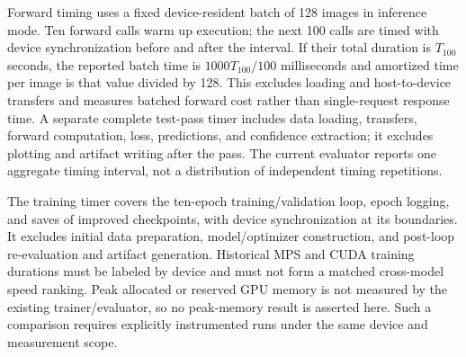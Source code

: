 Forward timing uses a fixed device-resident batch of 128 images in inference
mode. Ten forward calls warm up execution; the next 100 calls are timed with
device synchronization before and after the interval. If their total duration
is $T_{100}$ seconds, the reported batch time is $1000T_{100}/100$
milliseconds and amortized time per image is that value divided by 128.
This excludes loading and host-to-device transfers and measures batched
forward cost rather than single-request response time. A separate complete
test-pass timer includes data loading, transfers, forward computation, loss,
predictions, and confidence extraction; it excludes plotting and artifact
writing after the pass. The current evaluator reports one aggregate timing
interval, not a distribution of independent timing repetitions.

The training timer covers the ten-epoch training/validation loop, epoch
logging, and saves of improved checkpoints, with device synchronization at
its boundaries. It excludes initial data preparation, model/optimizer
construction, and post-loop re-evaluation and artifact generation. Historical
MPS and CUDA training durations must be labeled by device and must not form
a matched cross-model speed ranking. Peak allocated or reserved GPU memory
is not measured by the existing trainer/evaluator, so no peak-memory result
is asserted here. Such a comparison requires explicitly instrumented runs
under the same device and measurement scope.
